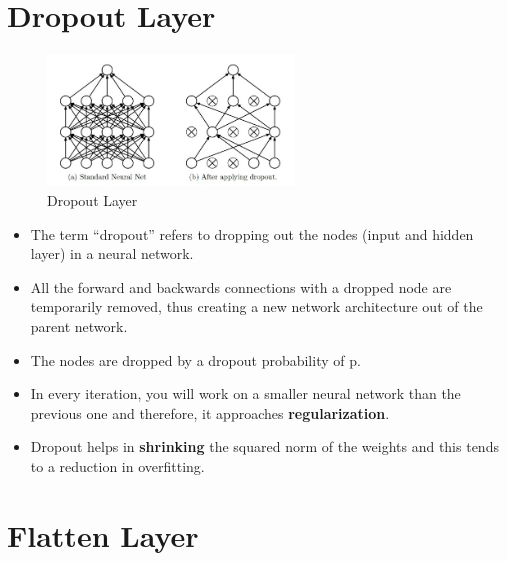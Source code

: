 
\section{Dropout Layer \cite{gfg-dropout-in-neural-networks,medium/towardsdatascience.com/dropout-in-neural-networks-47a162d621d9}}\label{nn: Dropout Layer}

\begin{figure}[H]
    \centering
    \includegraphics[width=\linewidth, height=3.5cm, keepaspectratio]{Pictures/layers/dropout.jpg}
    \caption{Dropout Layer \cite{medium/towardsdatascience.com/dropout-in-neural-networks-47a162d621d9}}
\end{figure}

\begin{itemize}
    \item The term “dropout” refers to dropping out the nodes (input and hidden layer) in a neural network. 
    
    \item All the forward and backwards connections with a dropped node are temporarily removed, thus creating a new network architecture out of the parent network. 
    
    \item The nodes are dropped by a dropout probability of p.

    \item In every iteration, you will work on a smaller neural network than the previous one and therefore, it approaches \textbf{regularization}.

    \item Dropout helps in \textbf{shrinking} the squared norm of the weights and this tends to a reduction in overfitting.
\end{itemize}




\section{Flatten Layer \cite{gfg/what-is-a-neural-network-flatten-layer}}\label{Flatten Layer}

